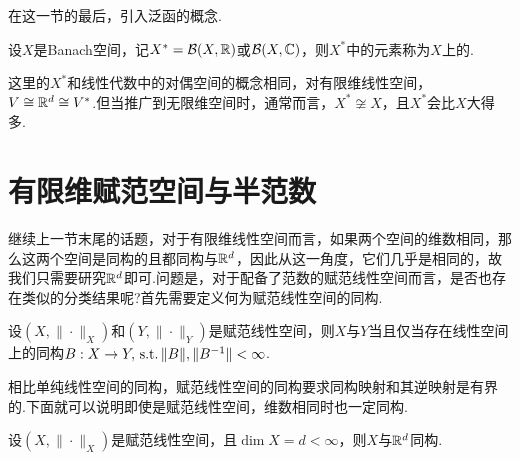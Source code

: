 在这一节的最后，引入泛函的概念.
\begin{definition}[有界线性泛函]
    设$X$是Banach空间，记$X^*=\mathcal{B}(X,\mathbb{R})$或$\mathcal{B}(X,\mathbb{C})$，则$X^*$中的元素称为$X$上的.
\end{definition}
这里的$X^*$和线性代数中的对偶空间的概念相同，对有限维线性空间，$V\cong \mathbb{R}^d\cong V^*$.但当推广到无限维空间时，通常而言，$X^*\not\cong X$，且$X^*$会比$X$大得多.\par

\section{有限维赋范空间与半范数}

继续上一节末尾的话题，对于有限维线性空间而言，如果两个空间的维数相同，那么这两个空间是同构的且都同构与$\mathbb{R}^d$，因此从这一角度，它们几乎是相同的，故我们只需要研究$\mathbb{R}^d$即可.问题是，对于配备了范数的赋范线性空间而言，是否也存在类似的分类结果呢?首先需要定义何为赋范线性空间的同构.\par
\begin{definition}[赋范线性空间的同构]
   设$(X,\|\cdot\|_X)$和$(Y,\|\cdot\|_Y)$是赋范线性空间，则$X$与$Y$当且仅当存在线性空间上的同构$B:X\to Y,\operatorname{\,\text{s.t.}} \|B\|,\|B^{-1}\|<\infty$.
\end{definition}
相比单纯线性空间的同构，赋范线性空间的同构要求同构映射和其逆映射是有界的.下面就可以说明即使是赋范线性空间，维数相同时也一定同构.
\begin{theorem}[]
    设$(X,\|\cdot\|_X)$是赋范线性空间，且$\dim X=d<\infty$，则$X$与$\mathbb{R}^d$同构.
\end{theorem}

